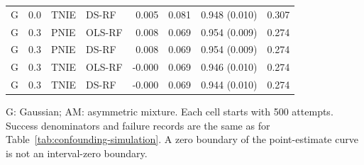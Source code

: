 \begin{table}[htbp]
\begin{tabular}{lrllrrrr}
G & 0.0 & TNIE & DS-RF & 0.005 & 0.081 & 0.948 (0.010) & 0.307\\
G & 0.3 & PNIE & OLS-RF & 0.008 & 0.069 & 0.954 (0.009) & 0.274\\
G & 0.3 & PNIE & DS-RF & 0.008 & 0.069 & 0.954 (0.009) & 0.274\\
G & 0.3 & TNIE & OLS-RF & -0.000 & 0.069 & 0.946 (0.010) & 0.274\\
G & 0.3 & TNIE & DS-RF & -0.000 & 0.069 & 0.944 (0.010) & 0.274\\
\bottomrule\end{tabular}
\par\smallskip\begin{minipage}{0.98\textwidth}\footnotesize G: Gaussian; AM: asymmetric mixture. Each cell starts with 500 attempts. Success denominators and failure records are the same as for Table~\ref{tab:confounding-simulation}. A zero boundary of the point-estimate curve is not an interval-zero boundary.\end{minipage}
\end{table}
